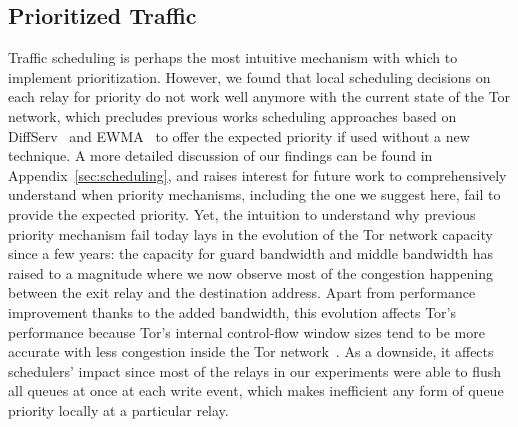 \subsection{Prioritized Traffic}
\label{subsub:prioritized}

Traffic scheduling is
perhaps the most intuitive mechanism with which to implement
prioritization. However, we found that local scheduling decisions on each relay for 
priority do not work well anymore with the current state of the Tor network, which 
precludes previous works scheduling approaches based on 
DiffServ~\cite{dovrolis1999case} and EWMA~\cite{tang2010improved} to offer the 
expected priority if used without a new technique. A more detailed
discussion of our findings can be found in Appendix~\ref{sec:scheduling}, and raises 
interest for future work to comprehensively understand when priority mechanisms, 
including the one we suggest here, fail to provide the expected priority. Yet, the 
intuition to understand why previous priority mechanism fail today lays in the 
evolution of the Tor network capacity since a few years: the capacity for guard 
bandwidth and middle bandwidth has raised to a magnitude where we now observe most 
of the congestion happening between the exit relay and the destination address. 
Apart from performance improvement thanks to the added bandwidth, this evolution 
affects Tor's performance because Tor's internal control-flow window sizes tend to 
be more accurate with less congestion inside the Tor network~\cite{archive-2009-mail, kiraly2008solving}. As a downside, it affects schedulers' impact since most of 
the relays in our experiments were able to flush all queues at once at each write 
event, which makes inefficient any form of queue priority locally at a particular 
relay.

